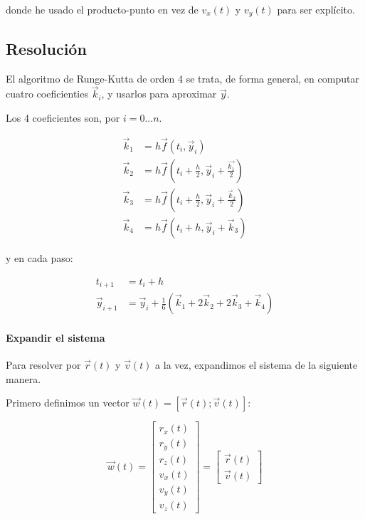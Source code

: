 donde he usado el producto-punto en vez de $v_x(t)$ y $v_y(t)$ para ser explícito.

\newpage 

\subsection{Resolución}

El algoritmo de Runge-Kutta de orden 4 se trata, de forma general, en computar cuatro coeficienties $\vec{k}_i$, y usarlos para aproximar $\vec{y}$.

Los 4 coeficientes son, por $i = 0 ... n$.

\begin{align*}
	\vec{k}_1 &=
h\vec{f}(t_i, \vec{y}_i) \\
	\vec{k}_2 &=
h\vec{f}(
	t_i + \frac{h}{2}, 
	\vec{y}_i + \frac{\vec{k_1}}{2}
) \\
	\vec{k}_3 &=
h\vec{f}(
	t_i + \frac{h}{2}, 
	\vec{y}_i + \frac{\vec{k}_2}{2}
) \\
	\vec{k}_4 &= 
h\vec{f}(
	t_i + h,
	\vec{y}_i + \vec{k}_3
)
\end{align*}

y en cada paso: 

\begin{align*}
	t_{i+1} &= t_i + h \\
	\vec{y}_{i+1} &=
\vec{y}_i + \frac{1}{6}(
	\vec{k}_1 +
	2\vec{k}_2 +
	2\vec{k}_3 +
	\vec{k}_4
)
\end{align*}

\paragraph{Expandir el sistema} Para resolver por $\vec{r}(t)$ y $\vec{v}(t)$ a la vez, expandimos el sistema de la siguiente manera.

Primero definimos un vector $\vec{w}(t) = [\vec{r}(t); \vec{v}(t)]$:

\begin{equation*}
	\vec{w}(t) = 
\begin{bmatrix}
	r_x(t) \\ r_y(t) \\ r_z(t) \\
	v_x(t) \\ v_y(t) \\ v_z(t)
\end{bmatrix} = 
\begin{bmatrix}
	\vec{r}(t) \\ \vec{v}(t)
\end{bmatrix}
\end{equation*}

